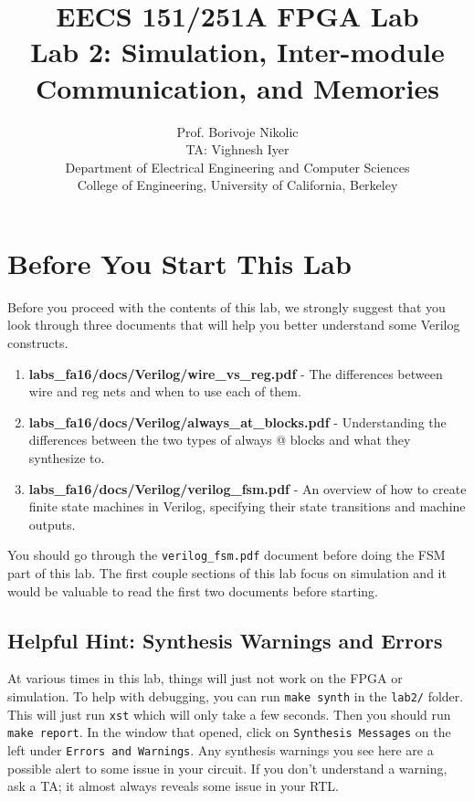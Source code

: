 \documentclass[11pt]{article}
\begin{document}
\title{EECS 151/251A FPGA Lab\\
Lab 2: Simulation, Inter-module Communication, and Memories}

\author{Prof. Borivoje Nikolic \\
TA: Vighnesh Iyer \\Department of Electrical Engineering and Computer Sciences\\
College of Engineering, University of California, Berkeley}
\date{}
\maketitle

\section{Before You Start This Lab}

Before you proceed with the contents of this lab, we strongly suggest that you look through three documents that will help you better understand some Verilog constructs.

\begin{enumerate}
	\item \textbf{labs\_fa16/docs/Verilog/wire\_vs\_reg.pdf} - The differences between wire and reg nets and when to use each of them.
	
	\item \textbf{labs\_fa16/docs/Verilog/always\_at\_blocks.pdf} - Understanding the differences between the two types of always @ blocks and what they synthesize to.
	
	\item \textbf{labs\_fa16/docs/Verilog/verilog\_fsm.pdf} - An overview of how to create finite state machines in Verilog, specifying their state transitions and machine outputs.

\end{enumerate}

You should go through the \verb|verilog_fsm.pdf| document before doing the FSM part of this lab. The first couple sections of this lab focus on simulation and it would be valuable to read the first two documents before starting.

\subsection{Helpful Hint: Synthesis Warnings and Errors}
At various times in this lab, things will just not work on the FPGA or simulation. To help with debugging, you can run \verb|make synth| in the \verb|lab2/| folder. This will just run \verb|xst| which will only take a few seconds. Then you should run \verb|make report|. In the window that opened, click on \verb|Synthesis Messages| on the left under \verb|Errors and Warnings|. Any synthesis warnings you see here are a possible alert to some issue in your circuit. If you don't understand a warning, ask a TA; it almost always reveals some issue in your RTL.
\end{document}
